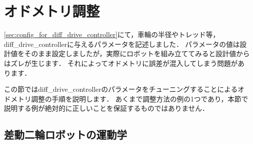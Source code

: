 \documentclass[{../../master}]{subfiles}
\begin{document}
\section{オドメトリ調整}

\ref{sec:config_for_diff_drive_controller}にて，車輪の半径やトレッド等，\textsf{diff\_drive\_controller}に与えるパラメータを記述しました．
パラメータの値は設計値をそのまま設定しましたが，実際にロボットを組み立ててみると設計値からはズレが生じます．
それによってオドメトリに誤差が混入してしまう問題があります．

この節では\textsf{diff\_drive\_controller}のパラメータをチューニングすることによるオドメトリ調整の手順を説明します．
あくまで調整方法の例の1つであり，本節で説明する例が絶対的に正しいことを保証するものではありません．

\subsection{差動二輪ロボットの運動学}
\end{document}
